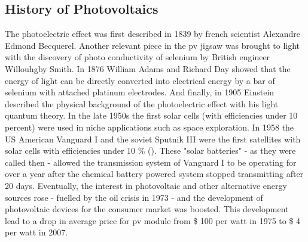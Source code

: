 \subsection{History of Photovoltaics}
The photoelectric effect was first described in 1839 by french scientist Alexandre 
Edmond \linebreak[4] 
Becquerel\cite{becquerel1839memoire}. %
Another relevant piece in the \gls{pv} jigsaw was brought to light
with the discovery of photo conductivity of selenium
by British engineer Willouhgby Smith\cite{Smith1873Selenium}.
In 1876 William Adams and Richard Day\cite{Adams1876Selenium} showed that 
the energy of light can be directly converted into electrical energy by a bar of 
selenium with attached platinum electrodes.
And finally, in 1905 Einstein described the physical background of the photoelectric 
effect with his light quantum theory\cite{einstein1905erzeugung}.
In the late 1950s the first solar cells (with efficiencies under 10 percent) were used in niche applications such as space exploration.  
In 1958 the US American Vanguard I\cite{vanguard2004} and the soviet Sputnik III\cite{sputnik1959} were the first satellites with solar cells with efficiencies under 10 \% ().
These "solar batteries" - as they were called then - allowed the transmission system of Vanguard I to be operating for over a year after the chemical battery powered system stopped transmitting after 20 days\cite{vanguard2004}. 
%
Eventually, the interest in photovoltaic and other alternative energy sources 
rose - fuelled by the oil crisis in 1973 - 
and the development of photovoltaic devices for the consumer market was boosted. 
This development lead to a drop in 
average price for \gls{pv} module from \$ 100 per watt in 1975 to \$ 4 per watt in 2007\cite{pagliaro2008flexible}.

